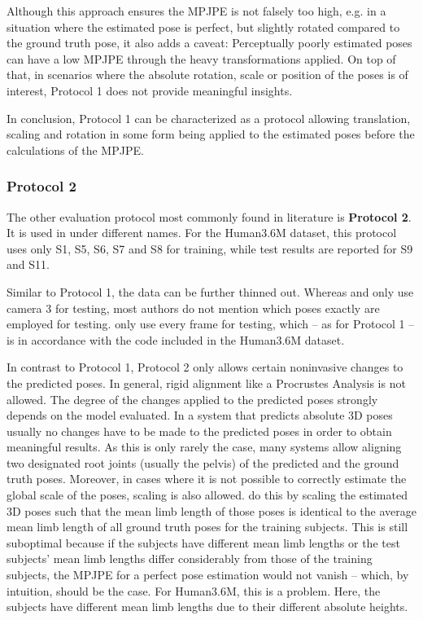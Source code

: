 Although this approach ensures the MPJPE is not falsely too high, e.g. in a situation where the estimated pose is perfect, but slightly rotated compared to the ground truth pose, it also adds a caveat:
Perceptually poorly estimated poses can have a low MPJPE through the heavy transformations applied.
On top of that, in scenarios where the absolute rotation, scale or position of the poses is of interest, Protocol 1 does not provide meaningful insights.

In conclusion, Protocol 1 can be characterized as a protocol allowing translation, scaling and rotation in some form being applied to the estimated poses before the calculations of the MPJPE.

\subsubsection{Protocol 2}\label{sec:protocol2}

The other evaluation protocol most commonly found in literature is \textbf{Protocol 2}.
It is used in \cite{sun17, moreno-noguer16, bogo16, martinez17, zhou18, zhou16, tekin16, pavlakos17} under different names.
For the Human3.6M dataset, this protocol uses only S1, S5, S6, S7 and S8 for training, while test results are reported for S9 and S11.

Similar to Protocol 1, the data can be further thinned out.
Whereas \citet{moreno-noguer16} and \citet{bogo16} only use camera 3 for testing, most authors do not mention which poses exactly are employed for testing.
\citet{sun17} only use every  frame for testing, which -- as for Protocol 1 -- is in accordance with the code included in the Human3.6M dataset.

In contrast to Protocol 1, Protocol 2 only allows certain noninvasive changes to the predicted poses.
In general, rigid alignment like a Procrustes Analysis is not allowed.
The degree of the changes applied to the predicted poses strongly depends on the model evaluated.
In a system that predicts absolute 3D poses usually no changes have to be made to the predicted poses in order to obtain meaningful results.
As this is only rarely the case, many systems \cite{martinez17, zhou18, zhou16, tekin16, pavlakos17} allow aligning two designated root joints (usually the pelvis) of the predicted and the ground truth poses.
Moreover, in cases where it is not possible to correctly estimate the global scale of the poses, scaling is also allowed.
\citet{zhou18} do this by scaling the estimated 3D poses such that the mean limb length of those poses is identical to the average mean limb length of all ground truth poses for the training subjects.
This is still suboptimal because if the subjects have different mean limb lengths or the test subjects' mean limb lengths differ considerably from those of the training subjects, the MPJPE for a perfect pose estimation would not vanish -- which, by intuition, should be the case.
For Human3.6M, this is a problem.
Here, the subjects have different mean limb lengths due to their different absolute heights.

